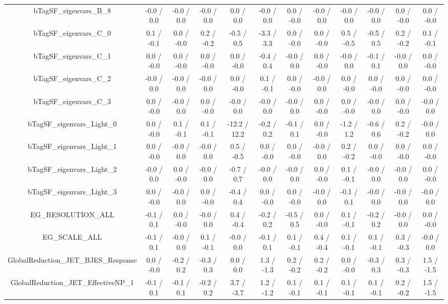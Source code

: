 \begin{table}[htbp]
\begin{center}
\begin{tabular}{|c|c|c|c|c|c|c|c|c|c|c|c|}
  bTagSF_eigenvars_B_8 & -0.0 / 0.0 & -0.0 / 0.0 & -0.0 / 0.0 & 0.0 / 0.0 & -0.0 / 0.0 & 0.0 / -0.0 & -0.0 / 0.0 & -0.0 / 0.0 & -0.0 / 0.0 & 0.0 / -0.0 & 0.0 / -0.0 \\ 
  bTagSF_eigenvars_C_0 & 0.1 / -0.1 & 0.0 / -0.0 & 0.2 / -0.2 & -0.5 / 0.5 & -3.3 / 3.3 & 0.0 / -0.0 & 0.0 / -0.0 & 0.5 / -0.5 & -0.5 / 0.5 & 0.2 / -0.2 & 0.1 / -0.1 \\ 
  bTagSF_eigenvars_C_1 & 0.0 / -0.0 & 0.0 / -0.0 & 0.0 / -0.0 & 0.0 / -0.0 & -0.4 / 0.4 & -0.0 / 0.0 & 0.0 / -0.0 & -0.0 / 0.0 & -0.1 / 0.1 & -0.0 / 0.0 & 0.0 / -0.0 \\ 
  bTagSF_eigenvars_C_2 & -0.0 / 0.0 & -0.0 / 0.0 & -0.0 / 0.0 & 0.0 / -0.0 & 0.1 / -0.1 & 0.0 / -0.0 & -0.0 / 0.0 & 0.0 / -0.0 & 0.0 / -0.0 & 0.0 / -0.0 & 0.0 / -0.0 \\ 
  bTagSF_eigenvars_C_3 & 0.0 / -0.0 & -0.0 / 0.0 & 0.0 / -0.0 & -0.0 / 0.0 & -0.0 / 0.0 & -0.0 / 0.0 & 0.0 / -0.0 & 0.0 / -0.0 & -0.0 / 0.0 & 0.0 / -0.0 & -0.0 / 0.0 \\ 
  bTagSF_eigenvars_Light_0 & 0.0 / -0.0 & 0.1 / -0.1 & 0.1 / -0.1 & -12.2 / 12.2 & -0.2 / 0.2 & -0.1 / 0.1 & 0.0 / -0.0 & -1.2 / 1.2 & -0.6 / 0.6 & 0.2 / -0.2 & -0.0 / 0.0 \\ 
  bTagSF_eigenvars_Light_1 & 0.0 / -0.0 & -0.0 / 0.0 & -0.0 / 0.0 & 0.5 / -0.5 & 0.0 / -0.0 & 0.0 / -0.0 & -0.0 / 0.0 & 0.2 / -0.2 & 0.0 / -0.0 & 0.0 / -0.0 & 0.0 / -0.0 \\ 
  bTagSF_eigenvars_Light_2 & -0.0 / 0.0 & 0.0 / -0.0 & -0.0 / 0.0 & -0.7 / 0.7 & -0.0 / 0.0 & -0.0 / 0.0 & 0.0 / -0.0 & 0.1 / -0.1 & -0.0 / 0.0 & -0.0 / 0.0 & 0.0 / -0.0 \\ 
  bTagSF_eigenvars_Light_3 & 0.0 / -0.0 & -0.0 / 0.0 & 0.0 / -0.0 & -0.4 / 0.4 & 0.0 / -0.0 & 0.0 / -0.0 & -0.0 / 0.0 & -0.1 / 0.1 & -0.0 / 0.0 & -0.0 / 0.0 & -0.0 / 0.0 \\ 
  EG_RESOLUTION_ALL & -0.1 / 0.1 & 0.0 / -0.0 & -0.0 / 0.0 & 0.4 / -0.4 & -0.2 / 0.2 & -0.5 / 0.5 & 0.0 / -0.0 & 0.1 / -0.1 & -0.2 / 0.2 & -0.0 / 0.0 & 0.0 / -0.0 \\ 
  EG_SCALE_ALL & -0.1 / 0.1 & -0.0 / 0.0 & 0.1 / -0.1 & -0.0 / 0.0 & -0.1 / 0.1 & 0.1 / -0.1 & 0.4 / -0.4 & 0.1 / -0.1 & 0.1 / -0.1 & 0.3 / -0.3 & -0.0 / 0.0 \\ 
  GlobalReduction_JET_BJES_Response & 0.0 / -0.0 & -0.2 / 0.2 & -0.3 / 0.3 & 0.0 / 0.0 & 1.3 / -1.3 & 0.2 / -0.2 & 0.2 / -0.2 & 0.0 / -0.0 & -0.3 / 0.3 & 0.3 / -0.3 & 1.5 / -1.5 \\ 
  GlobalReduction_JET_EffectiveNP_1 & -0.1 / 0.1 & -0.1 / 0.1 & -0.2 / 0.2 & 3.7 / -3.7 & 1.2 / -1.2 & 0.1 / -0.1 & 0.1 / -0.1 & 0.1 / -0.1 & 0.1 / -0.1 & 0.2 / -0.2 & 1.5 / -1.5 \\ 

\end{tabular}
\end{center}
\end{table}
